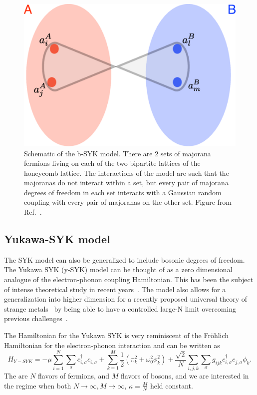 \begin{figure}
    \centering
    \includegraphics[scale = 0.5]{figures/introduction/bSYK.png}
    \caption{Schematic of the b-SYK model. There are 2 sets of majorana fermions living on each of the two bipartite lattices of the honeycomb lattice. The interactions of the model are such that the majoranas do not interact within a set, but every pair of majorana degrees of freedom in each set interacts with a Gaussian random coupling with every pair of majoranas on the other set. Figure from Ref.~\cite{Fremling_2022}.}
    \label{fig:bsyk}
\end{figure}

\subsection{Yukawa-SYK model}
The SYK model can also be generalized to include bosonic degrees of freedom. The Yukawa SYK (y-SYK) model can be thought of as a zero dimensional analogue of the electron-phonon coupling Hamiltonian. This has been the subject of intense theoretical study in recent years~\cite{esterlis2019cooper,wang2020quantum,wang2020solvable,classen2021superconductivity,inkof2022quantum,pan2021yukawa,davis2023quantum,grunwald2024dynamical,choi2022pairing}. The model also allows for a generalization into higher dimension for a recently proposed universal theory of strange metals~\cite{patel2023universal,valentinis2023correlation,esterlis2021large,guo2022large,guo2023large,li2024strange} by being able to have a controlled large-N limit overcoming previous challenges~\cite{lee2009low}.

\par
The Hamiltonian for the Yukawa SYK is very reminiscent of the Fr\"ohlich Hamiltonian for the electron-phonon interaction and can be written as 
\begin{equation}
    H_{Y-SYK} = -\mu\sum_{i=1}^N\sum_\sigma c^\dagger_{i,\sigma} c^{\phantom{\dagger}}_{i, \sigma} + \sum_{k=1}^M \frac{1}{2}\left(\pi_k^2 + \omega_0^2\phi_k^2\right) + \frac{\sqrt{2}}{N}\sum_{i,j,k}\sum_{\sigma}g_{ijk} c^\dagger_{i,\sigma} c^{\phantom{\dagger}}_{j,\sigma} \phi^{\phantom{\dagger}}_k .
    \label{eq:HYSYK}
\end{equation}
The are $N$ flavors of fermions, and $M$ flavors of bosons, and we are interested in the regime when both $N\rightarrow\infty, M\rightarrow\infty, \, \kappa = \frac{M}{N}$ held constant. 

